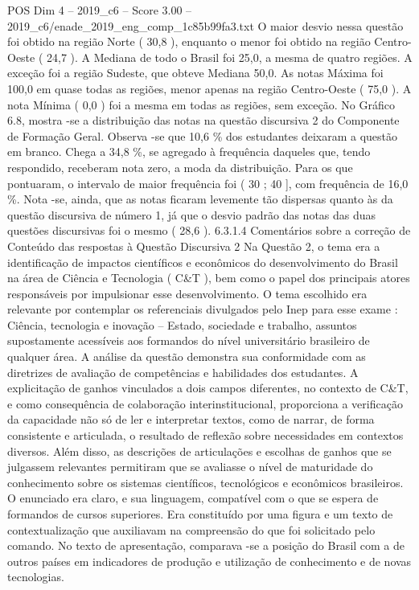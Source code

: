 \begin{textsample}{POS Dim 4 – 2019\_c6 – Score 3.00 – 2019\_c6/enade\_2019\_eng\_comp\_1c85b99fa3.txt}
O maior desvio nessa questão foi obtido na região Norte ( 30,8 ), enquanto o menor foi obtido na região Centro-Oeste ( 24,7 ).
A Mediana de todo o Brasil foi 25,0, a mesma de quatro regiões.
A exceção foi a região Sudeste, que obteve Mediana 50,0.
As notas Máxima foi 100,0 em quase todas as regiões, menor apenas na região Centro-Oeste ( 75,0 ).
A nota Mínima ( 0,0 ) foi a mesma em todas as regiões, sem exceção.
No Gráfico 6.8, mostra -se a distribuição das notas na questão discursiva 2 do Componente de Formação Geral.
Observa -se que 10,6 \% dos estudantes deixaram a questão em branco.
Chega a 34,8 \%, se agregado à frequência daqueles que, tendo respondido, receberam nota zero, a moda da distribuição.
Para os que pontuaram, o intervalo de maior frequência foi ( 30 ; 40 ], com frequência de 16,0 \%.
Nota -se, ainda, que as notas ficaram levemente tão dispersas quanto às da questão discursiva de número 1, já que o desvio padrão das notas das duas questões discursivas foi o mesmo ( 28,6 ). 6.3.1.4 Comentários sobre a correção de Conteúdo das respostas à Questão Discursiva 2 Na Questão 2, o tema era a identificação de impactos científicos e econômicos do desenvolvimento do Brasil na área de Ciência e Tecnologia ( C\&T ), bem como o papel dos principais atores responsáveis por impulsionar esse desenvolvimento.
O tema escolhido era relevante por contemplar os referenciais divulgados pelo Inep para esse exame : Ciência, tecnologia e inovação – Estado, sociedade e trabalho, assuntos supostamente acessíveis aos formandos do nível universitário brasileiro de qualquer área.
A análise da questão demonstra sua conformidade com as diretrizes de avaliação de competências e habilidades dos estudantes.
A explicitação de ganhos vinculados a dois campos diferentes, no contexto de C\&T, e como consequência de colaboração interinstitucional, proporciona a verificação da capacidade não só de ler e interpretar textos, como de narrar, de forma consistente e articulada, o resultado de reflexão sobre necessidades em contextos diversos.
Além disso, as descrições de articulações e escolhas de ganhos que se julgassem relevantes permitiram que se avaliasse o nível de maturidade do conhecimento sobre os sistemas científicos, tecnológicos e econômicos brasileiros.
O enunciado era claro, e sua linguagem, compatível com o que se espera de formandos de cursos superiores.
Era constituído por uma figura e um texto de contextualização que auxiliavam na compreensão do que foi solicitado pelo comando.
No texto de apresentação, comparava -se a posição do Brasil com a de outros países em indicadores de produção e utilização de conhecimento e de novas tecnologias.

\end{textsample}
